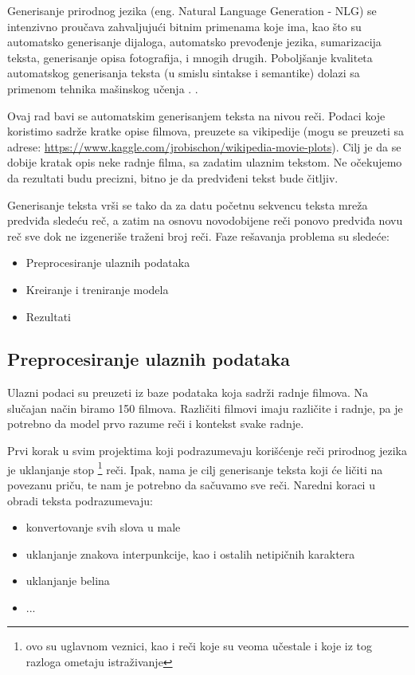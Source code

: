 \documentclass[a4paper]{article}
\begin{document}
Generisanje prirodnog jezika (eng. Natural Language Generation - NLG) se intenzivno proučava zahvaljujući bitnim primenama koje ima, kao što su automatsko generisanje dijaloga, automatsko prevođenje jezika, sumarizacija teksta, generisanje opisa fotografija, i mnogih drugih. Poboljšanje kvaliteta automatskog generisanja teksta (u smislu sintakse i semantike) dolazi sa primenom tehnika mašinskog učenja \cite{wang2018automatic}. .

Ovaj rad bavi se automatskim generisanjem teksta na nivou reči. Podaci koje koristimo sadrže kratke opise filmova, preuzete sa vikipedije (mogu se preuzeti sa adrese: \url{https://www.kaggle.com/jrobischon/wikipedia-movie-plots}). Cilj je da se dobije kratak opis neke radnje filma, sa zadatim ulaznim tekstom. Ne očekujemo da rezultati budu precizni, bitno je da predviđeni tekst bude čitljiv.

Generisanje teksta vrši se tako da za datu početnu sekvencu teksta mreža predviđa sledeću reč, a zatim na osnovu novodobijene reči ponovo predviđa novu reč sve dok ne izgeneriše traženi broj reči. Faze rešavanja problema su sledeće:
\begin{itemize}
    \item Preprocesiranje ulaznih podataka
    \item Kreiranje i treniranje modela
    \item Rezultati
\end{itemize}


\subsection{Preprocesiranje ulaznih podataka}

Ulazni podaci su preuzeti iz baze podataka koja sadrži radnje filmova. Na slučajan način biramo 150 filmova. Različiti filmovi imaju različite i radnje, pa je potrebno da model prvo razume reči i kontekst svake radnje.

Prvi korak u svim projektima koji podrazumevaju korišćenje reči prirodnog jezika je uklanjanje stop \footnote{ovo su uglavnom veznici, kao i reči koje su veoma učestale i koje iz tog razloga ometaju istraživanje} reči. Ipak, nama je cilj generisanje teksta koji će ličiti na povezanu priču, te nam je potrebno da sačuvamo sve reči. Naredni koraci u obradi teksta podrazumevaju:
\begin{itemize}
    \item konvertovanje svih slova u male
    \item uklanjanje znakova interpunkcije, kao i ostalih netipičnih karaktera
    \item uklanjanje belina
    \item ...
\end{itemize}
\end{document}
